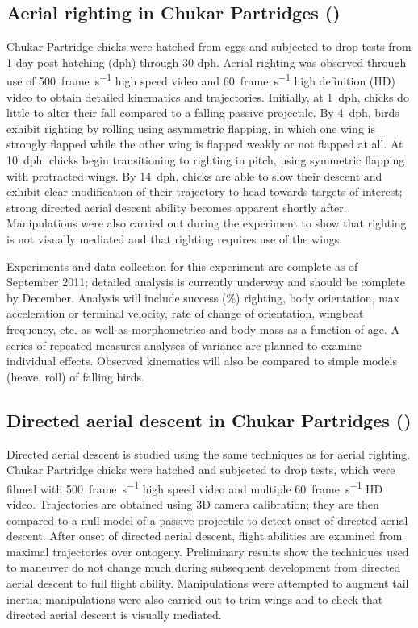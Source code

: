 \subsection{Aerial righting in Chukar Partridges (\Alectorischukar)}
Chukar Partridge chicks were hatched from eggs and subjected to drop tests from 1 day post hatching (dph) through 30 dph.  Aerial righting was observed through use of \SI{500}{frame\per\second} high speed video and \SI{60}{frame\per\second} high definition (HD) video to obtain detailed kinematics and trajectories.  Initially, at \SI{1}{dph}, chicks do little to alter their fall compared to a falling passive projectile.  By \SI{4}{dph}, birds exhibit righting by rolling using asymmetric flapping, in which one wing is strongly flapped while the other wing is flapped weakly or not flapped at all.  At \SI{10}{dph}, chicks begin transitioning to righting in pitch, using symmetric flapping with protracted wings.  By \SI{14}{dph}, chicks are able to slow their descent and exhibit clear modification of their trajectory to head towards targets of interest; strong directed aerial descent ability becomes apparent shortly after. Manipulations were also carried out during the experiment to show that righting is not visually mediated and that righting requires use of the wings. 

Experiments and data collection for this experiment are complete as of September 2011; detailed analysis is currently underway and should be complete by December.  Analysis will include success (\%) righting, body orientation, max acceleration or terminal velocity, rate of change of orientation, wingbeat frequency, etc. as well as morphometrics and body mass as a function of age. A series of repeated measures analyses of variance are planned to examine individual effects. Observed kinematics will also be compared to simple models (heave, roll) of falling birds.  

\subsection{Directed aerial descent in Chukar Partridges (\Alectorischukar)}
Directed aerial descent is studied using the same techniques as for aerial righting.  Chukar Partridge chicks were hatched and subjected to drop tests, which were filmed with \SI{500}{frame\per\second} high speed video and multiple \SI{60}{frame\per\second} HD video.  Trajectories are obtained using 3D camera calibration; they are then compared to a null model of a passive projectile to detect onset of directed aerial descent.  After onset of directed aerial descent, flight abilities are examined from maximal trajectories over ontogeny.  Preliminary results show the techniques used to maneuver do not change much during subsequent development from directed aerial descent to full flight ability.  Manipulations were attempted to augment tail inertia; manipulations were also carried out to trim wings and to check that directed aerial descent is visually mediated.


